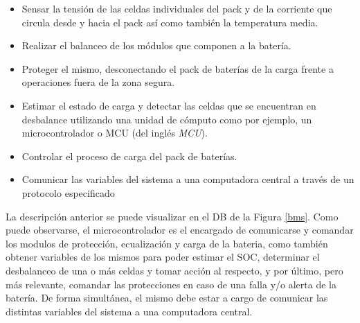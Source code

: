 \documentclass[10pt,a4paper]{article}
\begin{document}
\begin{itemize}
    \item Sensar la tensión de las celdas individuales del pack y de la 
	corriente que circula desde y hacia el pack as\'i como tambi\'en 
	la temperatura media.
    \item Realizar el balanceo de los m\'odulos que componen a la bater\'ia.
    \item Proteger el mismo, desconectando el pack de bater\'ias de la carga
	frente a operaciones fuera de la zona segura.
    \item Estimar el estado de carga y detectar las celdas que se encuentran
	en desbalance utilizando una unidad de cómputo como por ejemplo, un
	microcontrolador o \acrshort{MCU} (del ingl\'es \emph{\acrlong{MCU}}).
    \item Controlar el proceso de carga del pack de bater\'ias.
    \item Comunicar las variables del sistema a una computadora central a
	trav\'es de un protocolo especificado
\end{itemize}

\noindent La descripción anterior se puede visualizar en el \acrfull{DB} de la
Figura \ref{bms}. Como puede observarse, el microcontrolador es el encargado de
comunicarse y comandar los modulos de protecci\'on, ecualizaci\'on y carga de 
la bateria, como tambi\'en obtener variables de los mismos para poder estimar 
el \acrshort{SOC}, determinar el desbalanceo de una o m\'as celdas y tomar 
acci\'on al respecto, y por último, pero m\'as relevante, comandar las 
protecciones en caso de una falla y/o alerta de la batería. 
De forma simult\'anea, el mismo debe estar a cargo de comunicar las distintas 
variables del sistema a una computadora central.
\end{document}
